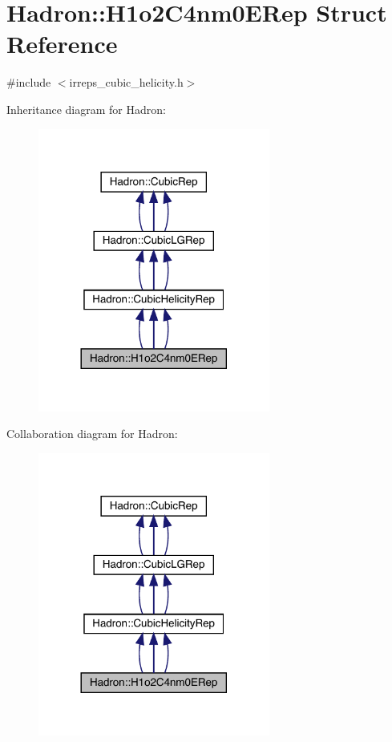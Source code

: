 \hypertarget{structHadron_1_1H1o2C4nm0ERep}{}\section{Hadron\+:\+:H1o2\+C4nm0\+E\+Rep Struct Reference}
\label{structHadron_1_1H1o2C4nm0ERep}


{\ttfamily \#include $<$irreps\+\_\+cubic\+\_\+helicity.\+h$>$}



Inheritance diagram for Hadron\+:
\nopagebreak
\begin{figure}[H]
\begin{center}
\leavevmode
\includegraphics[width=216pt]{d0/d02/structHadron_1_1H1o2C4nm0ERep__inherit__graph}
\end{center}
\end{figure}


Collaboration diagram for Hadron\+:
\nopagebreak
\begin{figure}[H]
\begin{center}
\leavevmode
\includegraphics[width=216pt]{da/d26/structHadron_1_1H1o2C4nm0ERep__coll__graph}
\end{center}
\end{figure}
